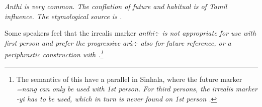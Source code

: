 



 


\em Anthi \em is very common. The conflation of future and habitual is of Tamil influence. The etymological source
is  \citep{Adelaar1991,Bakker2006}.


% 


 



Some speakers feel that the irrealis marker \em anthi$\div$ \em is not appropriate for use with first person and prefer the progressive \em arà$\div$ \em also for future reference, or a periphrastic construction with .\footnote{The semantics of this have a parallel in Sinhala, where the future marker \em =nang \em can only be used with 1st person. For third persons, the irrealis marker \em -yi \em  has to be used, which in turn is never found on 1st person \citep[784]{Gair2003}.}



